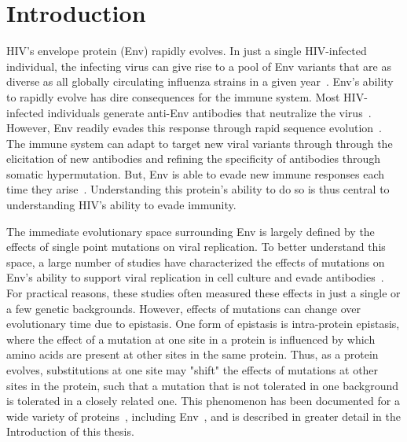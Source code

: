 \documentclass[9pt,lineno]{elife}
\begin{document}
\section{Introduction}
HIV's envelope protein (Env) rapidly evolves.
In just a single HIV-infected individual, the infecting virus can give rise to a pool of Env variants that are as diverse as all globally circulating influenza strains in a given year~\cite{korber2001evolutionary}.
Env's ability to rapidly evolve has dire consequences for the immune system.
Most HIV-infected individuals generate anti-Env antibodies that neutralize the virus~\cite{albert1990rapid,wei2003antibody,richman2003rapid}.
However, Env readily evades this response through rapid sequence evolution~\cite{albert1990rapid,wei2003antibody,richman2003rapid}.
The immune system can adapt to target new viral variants through through the elicitation of new antibodies and refining the specificity of antibodies through somatic hypermutation.
But, Env is able to evade new immune responses each time they arise~\cite{albert1990rapid,wei2003antibody,richman2003rapid}.
Understanding this protein's ability to do so is thus central to understanding HIV's ability to evade immunity.

The immediate evolutionary space surrounding Env is largely defined by the effects of single point mutations on viral replication.
To better understand this space, a large number of studies have characterized the effects of mutations on Env's ability to support viral replication in cell culture and evade antibodies~\cite{olshevsky1990identification,cordonnier1989single,basmaciogullari2002identification,freed1989mutational,lu2001structural,jacobs2005alanine,zwick2005anti,pantophlet2003fine,li2011mechanism,lynch2015hiv,haddox2016experimental}.
For practical reasons, these studies often measured these effects in just a single or a few genetic backgrounds.
However, effects of mutations can change over evolutionary time due to epistasis.
One form of epistasis is intra-protein epistasis, where the effect of a mutation at one site in a protein is influenced by which amino acids are present at other sites in the same protein.
Thus, as a protein evolves, substitutions at one site may "shift" the effects of mutations at other sites in the protein, such that a mutation that is not tolerated in one background is tolerated in a closely related one.
This phenomenon has been documented for a wide variety of proteins~\cite{weinreich2006darwinian,bloom2006protein,bershtein2006robustness,ortlund2007crystal,lunzer2010pervasive,gong2013stability,natarajan2013epistasis,harms2014historical,podgornaia2015pervasive}, including Env~\cite{freed1994evidence,wang1996single,da2010fitness,gasser2016buffering}, and is described in greater detail in the Introduction of this thesis.
\end{document}

